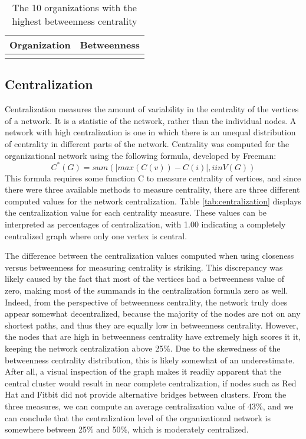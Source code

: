 \begin{table}
	\begin{tabular}{l|c}%
		\bfseries Organization & \bfseries Betweenness%
		\csvreader[head to column names]{betweenness.csv}{}%
		{\\\hline\organizationc & \scorec}%
	\end{tabular}
	\centering
	\caption{The 10 organizations with the highest betweenness centrality}\label{tab:betweenness}
\end{table}

\subsection{Centralization}
Centralization measures the amount of variability in the centrality of the vertices of a network. It is a statistic of the network, rather than the individual nodes. A network with high centralization is one in which there is an unequal distribution of centrality in different parts of the network.  Centrality was computed for the organizational network using the following formula, developed by Freeman\cite{freeman1978centrality}:
\begin{equation*}
C^*(G) = sum( |max(C(v))-C(i)|, i in V(G) )
\end{equation*}
This formula requires some function C to measure centrality of vertices, and since there were three available methods to measure centrality, there are three different computed values for the network centralization. Table \ref{tab:centralization} displays the centralization value for each centrality measure. These values can be interpreted as percentages of centralization, with 1.00 indicating a completely centralized graph where only one vertex is central.

The difference between the centralization values computed when using closeness versus betweenness for measuring centrality is striking. This discrepancy was likely caused by the fact that most of the vertices had a betweenness value of zero, making most of the summands in the centralization formula zero as well. Indeed, from the perspective of betweenness centrality, the network truly does appear somewhat decentralized, because the majority of the nodes are not on any shortest paths, and thus they are equally low in betweenness centrality. However, the nodes that are high in betweenness centrality have extremely high scores it it, keeping the network centralization above 25\%. Due to the skewedness of the betweenness centrality distribution, this is likely somewhat of an underestimate. After all, a visual inspection of the graph makes it readily apparent that the central cluster would result in near complete centralization, if nodes such as Red Hat and Fitbit did not provide alternative bridges between clusters. From the three measures, we can compute an average centralization value of 43\%, and we can conclude that the centralization level of the organizational network is somewhere between 25\% and 50\%, which is moderately centralized.

